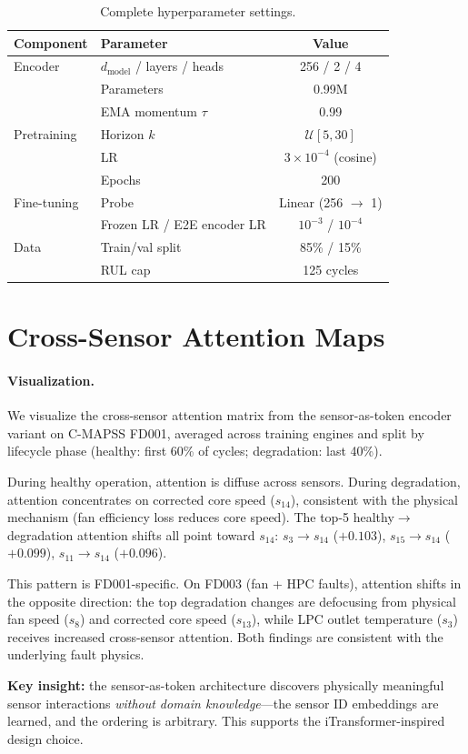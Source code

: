 \documentclass{article}
\begin{document}
\begin{table}[h]
\centering
\caption{Complete hyperparameter settings.}
\label{tab:hyperparams}
\small
\begin{tabular}{@{}llc@{}}
\toprule
Component & Parameter & Value \\
\midrule
Encoder & $d_\text{model}$ / layers / heads & 256 / 2 / 4 \\
& Parameters & 0.99M \\
& EMA momentum $\tau$ & 0.99 \\
Pretraining & Horizon $k$ & $\mathcal{U}[5, 30]$ \\
& LR & $3 \times 10^{-4}$ (cosine) \\
& Epochs & 200 \\
Fine-tuning & Probe & Linear (256 $\to$ 1) \\
& Frozen LR / E2E encoder LR & $10^{-3}$ / $10^{-4}$ \\
Data & Train/val split & 85\% / 15\% \\
& RUL cap & 125 cycles \\
\bottomrule
\end{tabular}
\end{table}

\section{Cross-Sensor Attention Maps}
\label{app:attention_maps}

\paragraph{Visualization.} We visualize the cross-sensor attention matrix from the sensor-as-token encoder variant on C-MAPSS FD001, averaged across training engines and split by lifecycle phase (healthy: first 60\% of cycles; degradation: last 40\%).

During healthy operation, attention is diffuse across sensors. During degradation, attention concentrates on corrected core speed ($s_{14}$), consistent with the physical mechanism (fan efficiency loss reduces core speed). The top-5 healthy$\to$degradation attention shifts all point toward $s_{14}$: $s_3 \to s_{14}$ ($+0.103$), $s_{15} \to s_{14}$ ($+0.099$), $s_{11} \to s_{14}$ ($+0.096$).

This pattern is FD001-specific. On FD003 (fan + HPC faults), attention shifts in the opposite direction: the top degradation changes are defocusing from physical fan speed ($s_8$) and corrected core speed ($s_{13}$), while LPC outlet temperature ($s_3$) receives increased cross-sensor attention. Both findings are consistent with the underlying fault physics.

\textbf{Key insight:} the sensor-as-token architecture discovers physically meaningful sensor interactions \emph{without domain knowledge}---the sensor ID embeddings are learned, and the ordering is arbitrary. This supports the iTransformer-inspired design choice.
\end{document}
